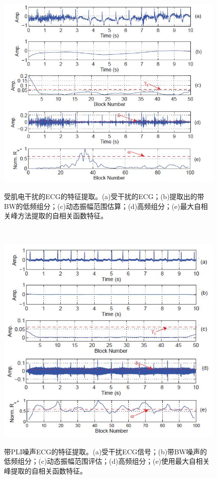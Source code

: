 \begin{figure}[htbp]
\begin{center}
\begin{minipage}{0.45\linewidth}
\label{figNo.4}
\centering
\includegraphics[height=0.8\textwidth]{fig4.jpg}
\caption{\kaishu \xiaowuhao 受肌电干扰的ECG的特征提取。(a)受干扰的ECG；(b)提取出的带BW的低频组分；(c)动态振幅范围估算；(d)高频组分；(e)最大自相关峰方法提取的自相关函数特征。}
\end{minipage}~~
\begin{minipage}{0.45\linewidth}
\label{figNo.5}
\centering
\includegraphics[height=0.8\textwidth]{fig5.jpg}
\caption{\kaishu \xiaowuhao 带PLI噪声ECG的特征提取。(a)受干扰ECG信号；(b)带BW噪声的低频组分；(c)动态振幅范围评估；(d)高频组分；(e)使用最大自相关峰提取的自相关函数特征。}

\end{minipage}
\end{center}
\end{figure}

